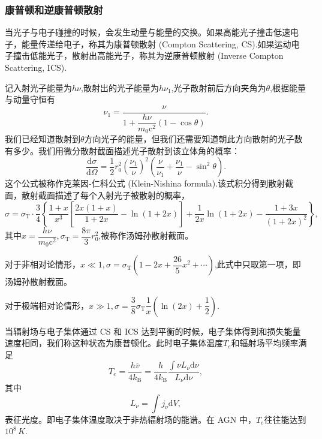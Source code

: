 \documentclass[../天体物理基础.tex]{subfiles}
\begin{document}
\subsubsection{康普顿和逆康普顿散射}
当光子与电子碰撞的时候，会发生动量与能量的交换。如果高能光子撞击低速电子，能量传递给电子，称其为康普顿散射 (Compton Scattering, CS).如果运动电子撞击低能光子，散射出高能光子，称其为逆康普顿散射 (Inverse Compton Scattering, ICS).

记入射光子能量为$h\nu$,散射出的光子能量为$h\nu_{1}$,光子散射前后方向夹角为$\theta$,根据能量与动量守恒有
\begin{equation}
\nu_{1}=\frac{\nu}{1+\dfrac{h\nu}{m_{0}\mathrm{c}^{2}}\left(1-\cos\theta\right)}.
\end{equation}
我们已经知道散射到$\theta$方向光子的能量，但我们还需要知道朝此方向散射的光子数有多少。我们用微分散射截面描述光子散射到该立体角的概率：
\begin{equation}
\frac{\mathrm{d}\sigma}{\mathrm{d}\Omega}=\frac{1}{2}r_{0}^{2}\left(\frac{\nu_{1}}{\nu}\right)^{2}\left(\frac{\nu}{\nu_{1}}+\frac{\nu_{1}}{\nu}-\sin^{2}\theta\right).
\end{equation}
这个公式被称作克莱因{}-{}仁科公式 (Klein-Nishina formula).该式积分得到散射截面，散射截面描述了每个入射光子被散射的概率，
\begin{equation}
\sigma=\sigma_{\text{T}}\cdot\frac34\left\{\frac{1+x}{x^{3}}\left[\frac{2x\left(1+x\right)}{1+2x}-\ln\left(1+2x\right)\right]+\frac1{2x}\ln\left(1+2x\right)-\frac{1+3x}{\left(1+2x\right)^{2}}\right\},
\end{equation}
其中$x=\dfrac{h\nu}{m_{0}\mathrm{c}^{2}},\sigma_{\text{T}}=\dfrac{8\pi}{3}r_{0}^{2}$,被称作汤姆孙散射截面。

对于非相对论情形，$x\ll1,\sigma=\sigma_{\text{T}}\left(1-2x+\dfrac{26}{5}x^{2}+\cdots\right)$,此式中只取第一项，即汤姆孙散射截面。

对于极端相对论情形，$x\gg1,\sigma=\dfrac{3}{8}\sigma_{\text{T}}\dfrac{1}{x}\left(\ln\left(2x\right)+\dfrac{1}{2}\right)$.

当辐射场与电子集体通过 CS 和 ICS 达到平衡的时候，电子集体得到和损失能量速度相同，我们称这种状态为康普顿化。此时电子集体温度$T_{e}$和辐射场平均频率满足
\begin{equation}
T_{e}=\frac{h\overline{v}}{4k_{\text{B}}}=\frac{h}{4k_{\text{B}}}\frac{\int\nu L_{\nu}\mathrm{d}\nu}{L_{\nu}\mathrm{d}\nu},
\end{equation}
其中
\begin{equation}
L_{\nu}=\int j_{\nu}\mathrm{d}V,
\end{equation}
表征光度。即电子集体温度取决于非热辐射场的能谱。在 AGN 中，$T_{e}$往往能达到$10^{8}\,\unit{K}$.
\end{document}

